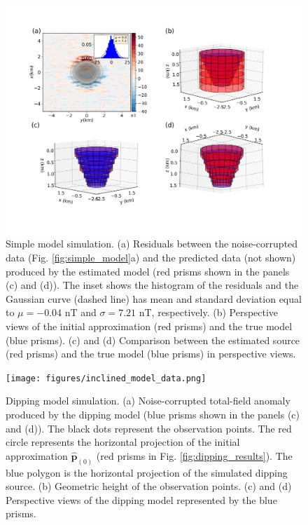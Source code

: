 \begin{figure}
	\centering
	\includegraphics[width=\linewidth]{figures/simple_results.png}
	\caption{Simple model simulation. (a) Residuals between the  noise-corrupted data (Fig. \ref{fig:simple_model}a) and the predicted data (not shown) produced by the estimated model (red prisms shown in the panels (c) and (d)). The inset shows the histogram of the residuals and the Gaussian curve (dashed line) has mean and standard deviation equal to $\mu = -0.04$ nT and $\sigma=7.21$ nT, respectively. (b) Perspective views of the initial approximation (red prisms) and the true model (blue prisms). (c) and (d) Comparison between the estimated source (red prisms) and the true model (blue prisms) in perspective views.}
	\label{fig:simple_results}
\end{figure}


\begin{figure}
    \centering
    \texttt{[image: figures/inclined\_model\_data.png]}
    \caption{Dipping model simulation. (a) Noise-corrupted total-field anomaly produced by the dipping model (blue prisms shown in the panels (c) and (d)). The black dots represent the observation points. The red circle represents the horizontal projection 
   	of the initial approximation $\hat{\mathbf{p}}_{(0)}$ 
   	(red prisms in Fig. \ref{fig:dipping_results}). The blue polygon is the horizontal projection of the simulated dipping source.
   	(b) Geometric height of the observation points. (c) and (d) Perspective views of the dipping model represented by the blue prisms.
}
    \label{fig:dipping_model}
\end{figure}

